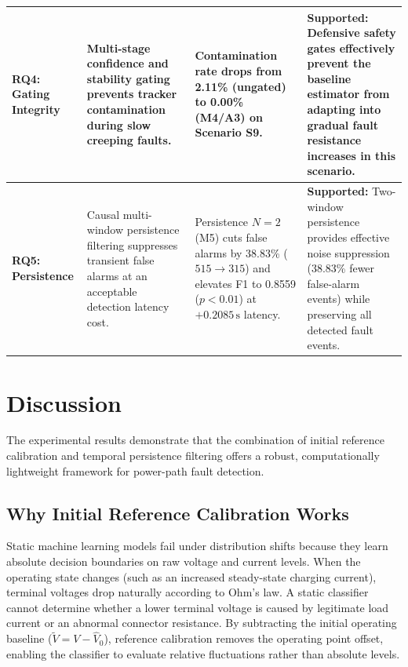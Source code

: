 \documentclass[conference]{IEEEtran}
\begin{document}
\begin{table}[!t]
\begin{tabularx}{\textwidth}{@{}l>{\raggedright\arraybackslash}X>{\raggedright\arraybackslash}p{4.2cm}>{\raggedright\arraybackslash}X@{}}
\midrule
\textbf{RQ4: Gating Integrity} & Multi-stage confidence and stability gating prevents tracker contamination during slow creeping faults. & Contamination rate drops from 2.11\% (ungated) to 0.00\% (M4/A3) on Scenario S9. & \textbf{Supported:} Defensive safety gates effectively prevent the baseline estimator from adapting into gradual fault resistance increases in this scenario. \\
\midrule
\textbf{RQ5: Persistence} & Causal multi-window persistence filtering suppresses transient false alarms at an acceptable detection latency cost. & Persistence $N=2$ (M5) cuts false alarms by 38.83\% ($515 \to 315$) and elevates F1 to 0.8559 ($p < 0.01$) at $+0.2085\,\text{s}$ latency. & \textbf{Supported:} Two-window persistence provides effective noise suppression (38.83\% fewer false-alarm events) while preserving all detected fault events. \\
\bottomrule
\end{tabularx}
\endgroup
\end{table}

\section{Discussion}
The experimental results demonstrate that the combination of initial reference calibration and temporal persistence filtering offers a robust, computationally lightweight framework for power-path fault detection. 

\subsection{Why Initial Reference Calibration Works}
Static machine learning models fail under distribution shifts because they learn absolute decision boundaries on raw voltage and current levels. When the operating state changes (such as an increased steady-state charging current), terminal voltages drop naturally according to Ohm's law. A static classifier cannot determine whether a lower terminal voltage is caused by legitimate load current or an abnormal connector resistance. By subtracting the initial operating baseline ($\tilde{V} = V - \hat{V}_0$), reference calibration removes the operating point offset, enabling the classifier to evaluate relative fluctuations rather than absolute levels.
\end{document}
